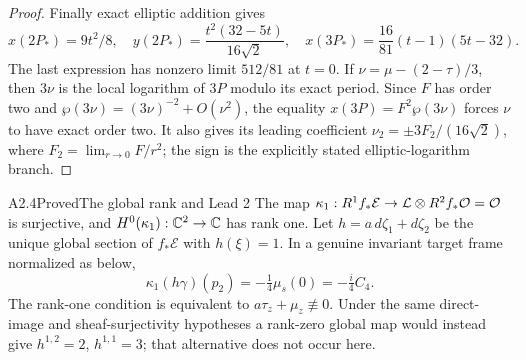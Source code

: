 \begin{proof}
Finally exact elliptic addition gives
\[
x(2P_*)=9t^2/8,\quad
y(2P_*)=\frac{t^2(32-5t)}{16\sqrt2},\quad
x(3P_*)=\frac{16}{81}(t-1)(5t-32).
\]
The last expression has nonzero limit $512/81$ at $t=0$.
If $\nu=\mu-(2-\tau)/3$, then $3\nu$ is the local logarithm of
$3P$ modulo its exact period.  Since $F$ has order two and
$\wp(3\nu)=(3\nu)^{-2}+O(\nu^2)$, the equality
$x(3P)=F^2\wp(3\nu)$ forces $\nu$ to have exact order two.
It also gives its leading coefficient
$\nu_2=\pm3F_2/(16\sqrt2)$, where $F_2=\lim_{r\to0}F/r^2$;
the sign is the explicitly stated elliptic-logarithm branch.
\end{proof}

\begin{claim}{A2.4}{Proved}{The global rank and Lead 2}
The map
$\kappa_1:R^1f_*\mathcal E\to\mathcal L\otimes R^2f_*\mathcal O=\mathcal O$
is surjective, and $H^0(\kappa_1):\mathbb C^2\to\mathbb C$ has rank one.
Let $h=a\,d\zeta_1+d\zeta_2$ be the unique global section of
$f_*\mathcal E$ with $h(\xi)=1$.  In a genuine invariant target
frame normalized as below,
\[
\kappa_1(h\gamma)(p_2)=-\tfrac14\mu_s(0)=-\tfrac i4 C_4.
\]
The rank-one condition is equivalent to
$a\tau_z+\mu_z\not\equiv0$.  Under the same direct-image and
sheaf-surjectivity hypotheses a rank-zero global map would instead
give $h^{1,2}=2$, $h^{1,1}=3$; that alternative does not occur here.
\end{claim}
